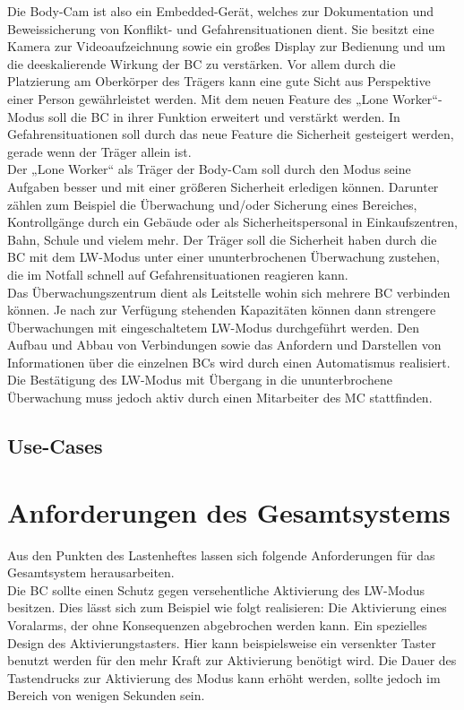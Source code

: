 \documentclass[thesis.tex]{subfiles}
\begin{document}
Die Body-Cam ist also ein Embedded-Gerät, welches zur Dokumentation und Beweissicherung von Konflikt- und Gefahrensituationen dient.
Sie besitzt eine Kamera zur Videoaufzeichnung sowie ein großes Display zur Bedienung und um die deeskalierende Wirkung der BC zu verstärken.
Vor allem durch die Platzierung am Oberkörper des Trägers kann eine gute Sicht aus Perspektive einer Person gewährleistet werden.
Mit dem neuen Feature des „Lone Worker“-Modus soll die BC in ihrer Funktion erweitert und verstärkt werden.
In Gefahrensituationen soll durch das neue Feature die Sicherheit gesteigert werden, gerade wenn der Träger allein ist.
\\

Der „Lone Worker“ als Träger der Body-Cam soll durch den Modus seine Aufgaben besser und mit einer größeren Sicherheit erledigen können.
Darunter zählen zum Beispiel die Überwachung und/oder Sicherung eines Bereiches, Kontrollgänge durch ein Gebäude oder
als Sicherheitspersonal in Einkaufszentren, Bahn, Schule und vielem mehr.
Der Träger soll die Sicherheit haben durch die BC mit dem LW-Modus unter einer ununterbrochenen Überwachung zustehen,
die im Notfall schnell auf Gefahrensituationen reagieren kann.
\\

Das Überwachungszentrum dient als Leitstelle wohin sich mehrere BC verbinden können.
Je nach zur Verfügung stehenden Kapazitäten können dann strengere Überwachungen mit eingeschaltetem LW-Modus durchgeführt werden.
Den Aufbau und Abbau von Verbindungen sowie das Anfordern und Darstellen von Informationen über die einzelnen BCs wird
durch einen Automatismus realisiert.
Die Bestätigung des LW-Modus mit Übergang in die ununterbrochene Überwachung muss jedoch aktiv durch einen Mitarbeiter des MC stattfinden.
\\

\subsection{Use-Cases}
\section{Anforderungen des Gesamtsystems}
Aus den Punkten des Lastenheftes lassen sich folgende Anforderungen für das Gesamtsystem herausarbeiten.
\\

Die BC sollte einen Schutz gegen versehentliche Aktivierung des LW-Modus besitzen.
Dies lässt sich zum Beispiel wie folgt realisieren: Die Aktivierung eines Voralarms, der ohne Konsequenzen abgebrochen werden kann.
Ein spezielles Design des Aktivierungstasters. Hier kann beispielsweise ein versenkter Taster benutzt werden für den mehr Kraft zur
Aktivierung benötigt wird.
Die Dauer des Tastendrucks zur Aktivierung des Modus kann erhöht werden, sollte jedoch im Bereich von wenigen Sekunden sein.
\\
\end{document}
